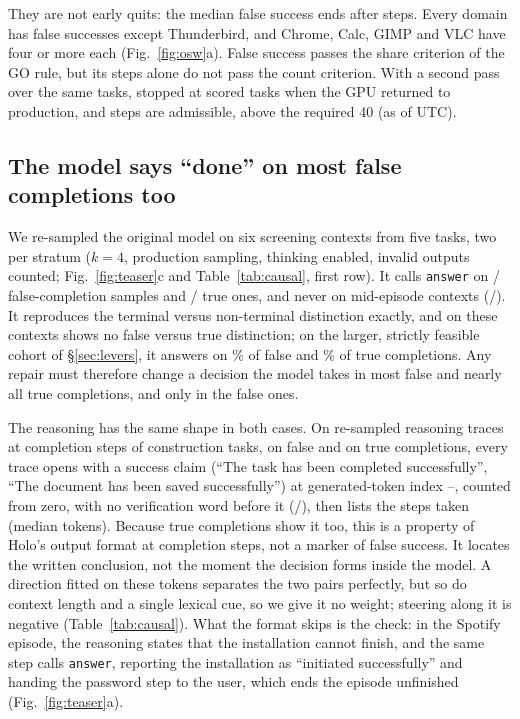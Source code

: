 They are not early quits: the median false success ends after \oswFsMedianSteps{} steps. Every domain has false successes except Thunderbird, and Chrome, Calc, GIMP and VLC have four or more each (Fig.~\ref{fig:osw}a). %
False success passes the share criterion of the GO rule, but its \oswLabFsPos{} \fsp{} steps alone do not pass the count criterion. With a second pass over the same tasks, stopped at \rtmPassTwoScored{} scored tasks when the GPU returned to production, \bAdmFsPos{} \fsp{} and \bAdmFsNeg{} \fsm{} steps are admissible, above the required 40 (as of \bStatusUtc{} UTC).


\subsection{The model says ``done'' on most false completions too}
\label{sec:think}
We re-sampled the original model on six screening contexts from five tasks, two per stratum ($k=4$, production sampling, thinking enabled, invalid outputs counted; Fig.~\ref{fig:teaser}c and Table~\ref{tab:causal}, first row). It calls \texttt{answer} on \bPilotFsAnswer/\bPilotFsN{} false-completion samples and \bPilotTrueAnswer/\bPilotTrueN{} true ones, and never on mid-episode contexts (\bPilotHealthyAnswer/\bPilotHealthyN). It reproduces the terminal versus non-terminal distinction exactly, and on these contexts shows no false versus true distinction; on the larger, strictly feasible cohort of \S\ref{sec:levers}, it answers on \pwOrigFspPct\% of false and \pwOrigFsmPct\% of true completions. Any repair must therefore change a decision the model takes in most false and nearly all true completions, and only in the false ones.

The reasoning has the same shape in both cases. On \thN{} re-sampled reasoning traces at completion steps of \thNTasks{} construction tasks, \thFsPosN{} on false and \thFsNegN{} on true completions, every trace opens with a success claim (``The task has been completed successfully'', ``The document has been saved successfully'') at generated-token index \thTokMin--\thTokMax, counted from zero, with no verification word before it (\thNVerif/\thN), then lists the steps taken (median \thMedLen{} tokens). %
Because true completions show it too, this is a property of Holo's output format at completion steps, not a marker of false success. It locates the written conclusion, not the moment the decision forms inside the model. A direction fitted on these tokens separates the two pairs perfectly, but so do context length and a single lexical cue, so we give it no weight; steering along it is negative (Table~\ref{tab:causal}). What the format skips is the check: in the Spotify episode, the reasoning states that the installation cannot finish, and the same step calls \texttt{answer}, reporting the installation as ``initiated successfully'' and handing the password step to the user, which ends the episode unfinished (Fig.~\ref{fig:teaser}a).
